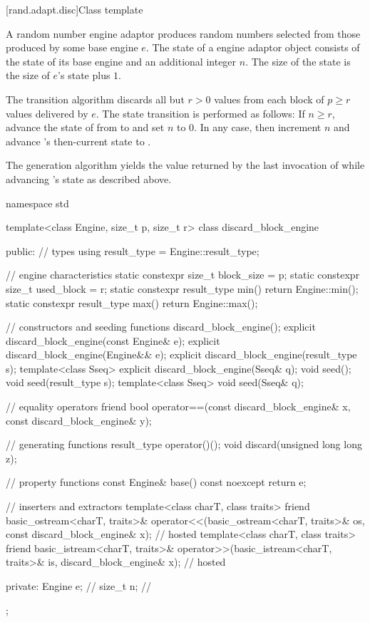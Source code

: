 [rand.adapt.disc]{Class template }%
%

\pnum
A  random number engine adaptor
produces random numbers
selected from those produced by some base engine $e$.
The state 
of a  engine adaptor object 
consists of the state  of its base engine 
and an additional integer $n$.
The size of the state is
 the size of $e$'s state plus $1$.

\pnum
The transition algorithm
discards all but $r > 0$ values
from each block of $p \geq r$ values delivered by $e$.
The state transition is performed as follows:
If $n \geq r$,
 advance the state of  from  to 
 and set $n$ to $0$.
In any case,
 then increment $n$
 and advance 's then-current state 
 to .

\pnum
The generation algorithm
yields the value returned by the last invocation of 
 while advancing 's state as described above.

%
%
\begin{codeblock}
namespace std {
  template<class Engine, size_t p, size_t r>
  class discard_block_engine {
  public:
    // types
    using result_type = Engine::result_type;

    // engine characteristics
    static constexpr size_t block_size = p;
    static constexpr size_t used_block = r;
    static constexpr result_type min() { return Engine::min(); }
    static constexpr result_type max() { return Engine::max(); }

    // constructors and seeding functions
    discard_block_engine();
    explicit discard_block_engine(const Engine& e);
    explicit discard_block_engine(Engine&& e);
    explicit discard_block_engine(result_type s);
    template<class Sseq> explicit discard_block_engine(Sseq& q);
    void seed();
    void seed(result_type s);
    template<class Sseq> void seed(Sseq& q);

    // equality operators
    friend bool operator==(const discard_block_engine& x, const discard_block_engine& y);

    // generating functions
    result_type operator()();
    void discard(unsigned long long z);

    // property functions
    const Engine& base() const noexcept { return e; }

    // inserters and extractors
    template<class charT, class traits>
      friend basic_ostream<charT, traits>&
        operator<<(basic_ostream<charT, traits>& os, const discard_block_engine& x);    // hosted
    template<class charT, class traits>
      friend basic_istream<charT, traits>&
        operator>>(basic_istream<charT, traits>& is, discard_block_engine& x);          // hosted

  private:
    Engine e;   // \expos
    size_t n;   // \expos
  };
}
\end{codeblock}

